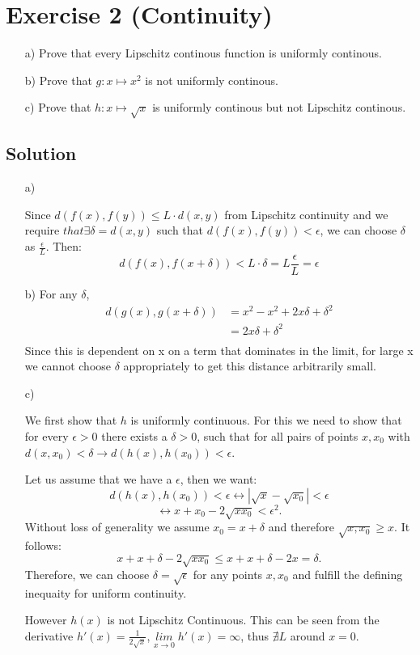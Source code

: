\documentclass[10pt]{article}
\numberwithin{equation}{section}
\begin{document}
\section*{Exercise 2 (Continuity)}
\begin{enumerate}
\item[a)]{
    Prove that every Lipschitz continous function is uniformly continous.
  }
\item[b)]{
    Prove that $g: x \mapsto x^2$ is not uniformly continous.
  }
\item[c)]{
    Prove that $h: x \mapsto \sqrt{x}$ is uniformly continous but not Lipschitz continous.
  }
\end{enumerate}
\subsection*{Solution}
\begin{enumerate}
\item[a)]{
    Since $d(f(x),f(y)) \leq L \cdot d(x,y)$ from Lipschitz continuity and we require $that  \exists \delta = d(x,y)$ such that $d(f(x),f(y)) < \epsilon$, we can choose $\delta$ as $\frac{\epsilon}{L}$. Then:
    $$d(f(x), f(x+\delta)) < L \cdot \delta = L \frac{\epsilon}{L} = \epsilon$$

  }
\item[b)]{
    For any $\delta$,
    \begin{align*}
      d(g(x), g(x + \delta)) &= x^2 - x^2 + 2x\delta + \delta^2\\
                           &= 2x\delta + \delta^2\\
    \end{align*}
    Since this is dependent on x on a term that dominates in the limit, for large x we cannot choose $\delta$ appropriately to get this distance arbitrarily small.
  }
\item[c)]{
		We first show that $h$ is uniformly continuous. For this we need to show that for every $\epsilon > 0$ there exists a $\delta > 0$, such that for all pairs of points $x, x_0$ with $d(x, x_0)<\delta \rightarrow d(h(x), h(x_0))< \epsilon$. 

Let us assume that we have a $\epsilon$, then we want:
$$
		d(h(x), h(x_0)) <\epsilon \leftrightarrow |\sqrt{x} - \sqrt{x_0}| < \epsilon
$$
$$
		\leftrightarrow x + x_0 -2 \sqrt{x x_0} < \epsilon^2.
$$
		Without loss of generality we assume $x_0 = x + \delta$ and therefore $\sqrt{x, x_0} \geq x$. It follows:
$$
		x + x + \delta - 2 \sqrt{x x_0} \leq x + x +\delta -2 x = \delta.
$$
		Therefore, we can choose $\delta = \sqrt{\epsilon}$ for any points $x, x_0$ and fulfill the defining inequaity for uniform continuity. 

		However $h(x)$ is not Lipschitz Continuous. This can be seen from the derivative  $h'(x) = \frac{1}{2\sqrt{x}}$, $\underset{x\rightarrow 0}{lim} \; h'(x) = \infty$, thus $\nexists L$ around $x=0$. 
  }

\end{enumerate}
\end{document}
